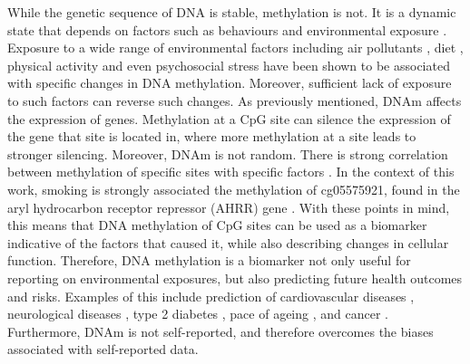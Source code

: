\documentclass[draft]{article}
\begin{document}

While the genetic sequence of DNA is stable, methylation is not. It is a dynamic state that depends on factors such as behaviours and environmental exposure \cite{greenberg2019diverse}. Exposure to a wide range of environmental factors including air pollutants \cite{martin2018environmental}, diet \cite{ma2020whole}, physical activity and even psychosocial stress \cite{opsasnick2024epigenome} have been shown to be associated with specific changes in DNA methylation. Moreover, sufficient lack of exposure to such factors can reverse such changes. As previously mentioned, DNAm affects the expression of genes. Methylation at a CpG site can silence the expression of the gene that site is located in, where more methylation at a site leads to stronger silencing. Moreover, DNAm is not random. There is strong correlation between methylation of specific sites with specific factors \cite{ewasatlas}. In the context of this work, smoking is strongly associated the methylation of cg05575921, found in the aryl hydrocarbon receptor
repressor (AHRR) gene \cite{reynolds2015dna}. With these points in mind, this means that DNA methylation of CpG sites can be used as a biomarker indicative of the factors that caused it, while also describing changes in cellular function. Therefore, DNA methylation is a biomarker not only useful for reporting on environmental exposures, but also predicting future health outcomes and risks. Examples of this include prediction of cardiovascular diseases \cite{cameron2023dna}, neurological diseases \cite{cells11213439}, type 2 diabetes \cite{cheng2023development}, pace of ageing \cite{10.7554/eLife.73420}, and cancer \cite{luo2020circulating}. Furthermore, DNAm is not self-reported, and therefore overcomes the biases associated with self-reported data.
\end{document}
